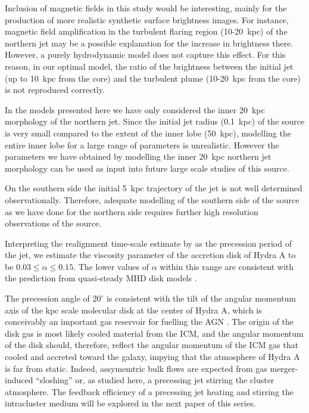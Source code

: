 \documentclass[useAMS, usenatbib]{mn2e}
\begin{document}
Inclusion of magnetic fields in this study would be interesting, mainly for the production of more realistic synthetic surface brightness images. For instance, magnetic field amplification in the turbulent flaring region (10-20~kpc) of the northern jet may be a possible explanation for the increase in brightness there. However, a purely hydrodynamic model does not capture this effect. For this reason, in our optimal model, the ratio of the brightness between the initial jet (up to 10~kpc from the core) and the turbulent plume (10-20~kpc from the core) is not reproduced correctly. 

In the models presented here we have only considered the inner 20~kpc morphology of the northern jet. Since the initial jet radius (0.1~kpc) of the source is very small compared to the extent of the inner lobe (50~kpc), modelling the entire inner lobe for a large range of parameters is unrealistic. However the parameters we have obtained by modelling the inner 20~kpc northern jet morphology can be used as input into future large scale studies of this source. 

On the southern side the initial 5~kpc trajectory of the jet is not well determined observationally. Therefore, adequate modelling of the southern side of the source as we have done for the northern side requires further high resolution observations of the source. 

Interpreting the realignment time-scale estimate by \citet{natarajan98} as the precession period of the jet, we estimate the viscosity parameter of the accretion disk of Hydra A to be $0.03\le \alpha \le 0.15$. The lower values of $\alpha$ within this range are consistent with the prediction from quasi-steady MHD disk models \citep{parkin13b}. 

\citep{New paragraph added here}
The precession angle of $20^\circ$ is consistent with the tilt of the angular momentum axis of the kpc scale molecular disk at the center of Hydra A, which is conceivably an important gas reservoir for fuelling the AGN \citep{hamer2014a}. The origin of the disk gas is most likely cooled material from the ICM, and the angular momentum of the disk should, therefore, reflect the angular momentum of the ICM gas that cooled and accreted toward the galaxy, impying that the atmosphere of Hydra A is far from static. Indeed, assymemtric bulk flows are expected from gas merger-induced ``sloshing'' \citep{zuhone2010a} or, as studied here, a precessing jet stirring the cluster atmosphere. The feedback efficiency of a precessing jet heating and stirring the intracluster medium will be explored in the next paper of this series.
\end{document}
